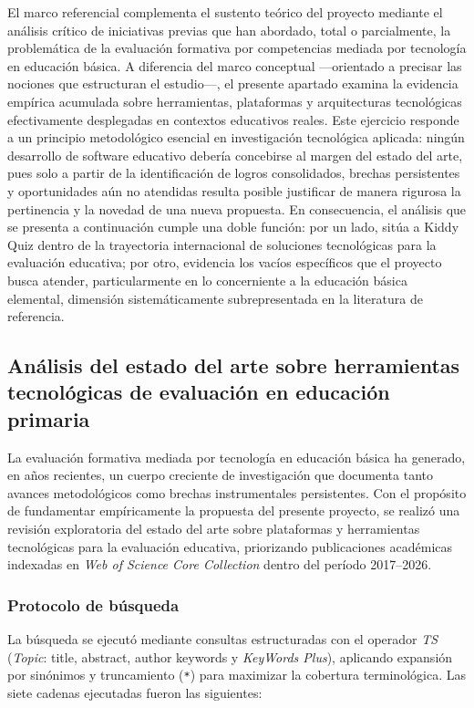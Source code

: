 El marco referencial complementa el sustento teórico del proyecto mediante el análisis crítico de iniciativas previas que han abordado, total o parcialmente, la problemática de la evaluación formativa por competencias mediada por tecnología en educación básica. A diferencia del marco conceptual ---orientado a precisar las nociones que estructuran el estudio---, el presente apartado examina la evidencia empírica acumulada sobre herramientas, plataformas y arquitecturas tecnológicas efectivamente desplegadas en contextos educativos reales. Este ejercicio responde a un principio metodológico esencial en investigación tecnológica aplicada: ningún desarrollo de software educativo debería concebirse al margen del estado del arte, pues solo a partir de la identificación de logros consolidados, brechas persistentes y oportunidades aún no atendidas resulta posible justificar de manera rigurosa la pertinencia y la novedad de una nueva propuesta. En consecuencia, el análisis que se presenta a continuación cumple una doble función: por un lado, sitúa a Kiddy Quiz dentro de la trayectoria internacional de soluciones tecnológicas para la evaluación educativa; por otro, evidencia los vacíos específicos que el proyecto busca atender, particularmente en lo concerniente a la educación básica elemental, dimensión sistemáticamente subrepresentada en la literatura de referencia.

\subsection{Análisis del estado del arte sobre herramientas tecnológicas de evaluación en educación primaria}
\label{subsec:estado-arte}

La evaluación formativa mediada por tecnología en educación básica ha generado, en años recientes, un cuerpo creciente de investigación que documenta tanto avances metodológicos como brechas instrumentales persistentes. Con el propósito de fundamentar empíricamente la propuesta del presente proyecto, se realizó una revisión exploratoria del estado del arte sobre plataformas y herramientas tecnológicas para la evaluación educativa, priorizando publicaciones académicas indexadas en \textit{Web of Science Core Collection} dentro del período 2017--2026.

\subsubsection{Protocolo de búsqueda}

La búsqueda se ejecutó mediante consultas estructuradas con el operador \textit{TS} (\textit{Topic}: title, abstract, author keywords y \textit{KeyWords Plus}), aplicando expansión por sinónimos y truncamiento (\texttt{*}) para maximizar la cobertura terminológica. Las siete cadenas ejecutadas fueron las siguientes:

